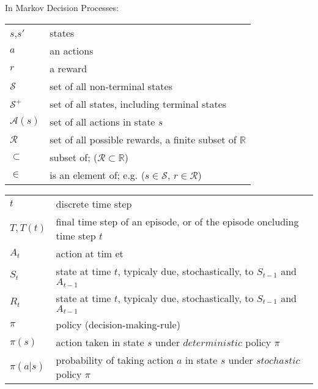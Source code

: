 \documentclass[8pt, landscape]{article}
\begin{document}
\begin{multicols}{3}
        In Markov Decision Processes:
        \begin{tabular}{ p{} p{} }
            $s$,$s'$          & states                                                        \\
            $a$               & an actions                                                    \\
            $r$               & a reward                                                      \\
            $\mathcal{S}$     & set of all non-terminal states                                \\
            $\mathcal{S}^{+}$ & set of all states, including terminal states                  \\
            $\mathcal{A}(s)$  & set of all actions in state $s$                               \\
            $\mathcal{R}$     & set of all possible rewards, a finite subset of $\mathbb{R}$  \\
            $\subset$         & subset of; ($\mathcal{R}\subset\mathbb{R}$)                   \\
            $\in$             & is an element of; e.g. ($s\in\mathcal{S}$, $r\in\mathcal{R}$) \\
        \end{tabular}

        \begin{tabular}{ p{} p{} }
            $t$        & discrete time step                                                            \\
            $T, T(t)$  & final time step of an episode, or of the episode oncluding time step $t$      \\
            $A_t$      & action at tim et                                                              \\
            $S_t$      & state at time $t$, typicaly due, stochastically, to $S_{t-1}$ and $A_{t-1}$   \\
            $R_t$      & state at time $t$, typicaly due, stochastically, to $S_{t-1}$ and $A_{t-1}$   \\
            $\pi$      & policy (decision-making-rule)                                                 \\
            $\pi(s)$   & action taken in state $s$ under $deterministic$ policy $\pi$                  \\
            $\pi(a|s)$ & probability of taking action $a$ in state $s$ under $stochastic$ policy $\pi$ \\
        \end{tabular}


\end{multicols}
\end{document}
